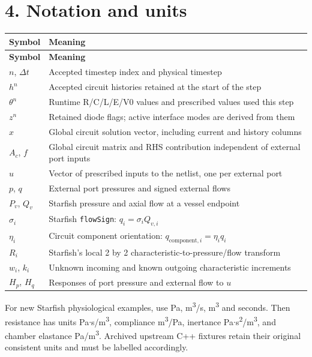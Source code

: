 \documentclass[11pt,a4paper]{article}
\begin{document}
\section{4. Notation and units}

\begingroup\footnotesize
\setlength{\tabcolsep}{4pt}
\renewcommand{\arraystretch}{1.17}
\begin{longtable}{>{\raggedright\arraybackslash}p{}>{\raggedright\arraybackslash}p{}}
\toprule
\textbf{Symbol} & \textbf{Meaning} \\
\midrule
\endfirsthead
\textbf{Symbol} & \textbf{Meaning} \\
\midrule
\endhead
\bottomrule
\endfoot
\(n\), \(\Delta t\) & Accepted timestep index and physical timestep \\[3pt]
\(h^n\) & Accepted circuit histories retained at the start of the step \\[3pt]
\(\theta^n\) & Runtime R/C/L/E/V0 values and prescribed values used this step \\[3pt]
\(z^n\) & Retained diode flags; active interface modes are derived from them \\[3pt]
\(x\) & Global circuit solution vector, including current and history columns \\[3pt]
\(A_c\), \(f\) & Global circuit matrix and RHS contribution independent of external port inputs \\[3pt]
\(u\) & Vector of prescribed inputs to the netlist, one per external port \\[3pt]
\(p\), \(q\) & External port pressures and signed external flows \\[3pt]
\(P_v\), \(Q_v\) & Starfish pressure and axial flow at a vessel endpoint \\[3pt]
\(\sigma_i\) & Starfish \texttt{flow\allowbreak{}Sign}: \(q_i=\sigma_i Q_{v,i}\) \\[3pt]
\(\eta_i\) & Circuit component orientation: \(q_{\mathrm{component},i}=\eta_i q_i\) \\[3pt]
\(R_i\) & Starfish's local 2 by 2 characteristic-to-pressure/flow transform \\[3pt]
\(w_i\), \(k_i\) & Unknown incoming and known outgoing characteristic increments \\[3pt]
\(H_p\), \(H_q\) & Responses of port pressure and external flow to \(u\) \\[3pt]
\end{longtable}
\endgroup
For new Starfish physiological examples, use Pa, m\textsuperscript{3}/s, m\textsuperscript{3} and seconds. Then resistance has units Pa\ensuremath{\cdot}s/m\textsuperscript{3}, compliance m\textsuperscript{3}/Pa, inertance Pa\ensuremath{\cdot}s\textsuperscript{2}/m\textsuperscript{3}, and chamber elastance Pa/m\textsuperscript{3}. Archived upstream C++ fixtures retain their original consistent units and must be labelled accordingly.
\end{document}
